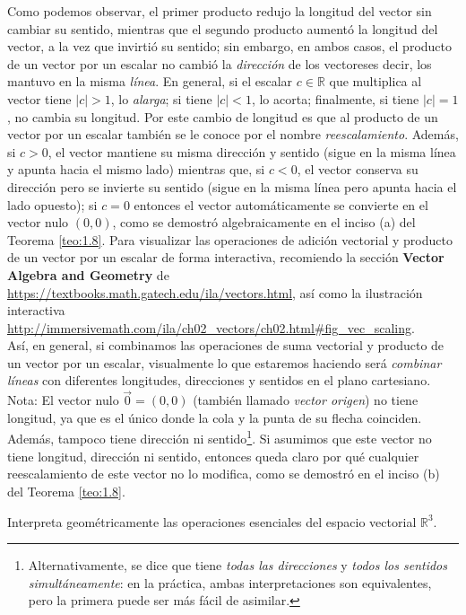 \documentclass[notasLineal]{subfiles}
\begin{document}
Como podemos observar, el primer producto redujo la longitud del vector sin cambiar su sentido, mientras que el segundo producto aumentó la longitud del vector, a la vez que invirtió su sentido; sin embargo, en ambos casos, el producto de un vector por un escalar no cambió la \emph{dirección} de los vectores\textemdash es decir, los mantuvo en la misma \emph{línea}. En general, si el escalar $c\in\mathbb{R}$ que multiplica al vector tiene $|c|>1$, lo \emph{alarga}; si tiene $|c|<1$, lo acorta; finalmente, si tiene $|c|=1$, no cambia su longitud. Por este cambio de longitud es que al producto de un vector por un escalar también se le conoce por el nombre \emph{reescalamiento}. Además, si $c>0$, el vector mantiene su misma dirección y sentido (sigue en la misma línea y apunta hacia el mismo lado) mientras que, si $c<0$, el vector conserva su dirección pero se invierte su sentido (sigue en la misma línea pero apunta hacia el lado opuesto); si $c=0$ entonces el vector automáticamente se convierte en el vector nulo $(0,0)$, como se demostró algebraicamente en el inciso (a) del Teorema \ref{teo:1.8}. Para visualizar las operaciones de adición vectorial y producto de un vector por un escalar de forma interactiva, recomiendo la sección \textbf{Vector Algebra and Geometry} de \url{https://textbooks.math.gatech.edu/ila/vectors.html}, así como la ilustración interactiva \url{http://immersivemath.com/ila/ch02_vectors/ch02.html#fig_vec_scaling}. \\

    Así, en general, si combinamos las operaciones de suma vectorial y producto de un vector por un escalar, visualmente lo que estaremos haciendo será \emph{combinar líneas} con diferentes longitudes, direcciones y sentidos en el plano cartesiano. \\

Nota: El vector nulo $\vec{0}=(0,0)$ (también llamado \emph{vector origen}) no tiene longitud, ya que es el único donde la cola y la punta de su flecha coinciden. Además, tampoco tiene dirección ni sentido\footnote{Alternativamente, se dice que tiene \emph{todas las direcciones} y \emph{todos los sentidos simultáneamente}: en la práctica, ambas interpretaciones son equivalentes, pero la primera puede ser más fácil de asimilar.}. Si asumimos que este vector no tiene longitud, dirección ni sentido, entonces queda claro por qué cualquier reescalamiento de este vector no lo modifica, como se demostró en el inciso (b) del Teorema \ref{teo:1.8}.

\begin{Ejer}
    Interpreta geométricamente las operaciones esenciales del espacio vectorial $\mathbb{R}^3$.
\end{Ejer}
\end{document}
